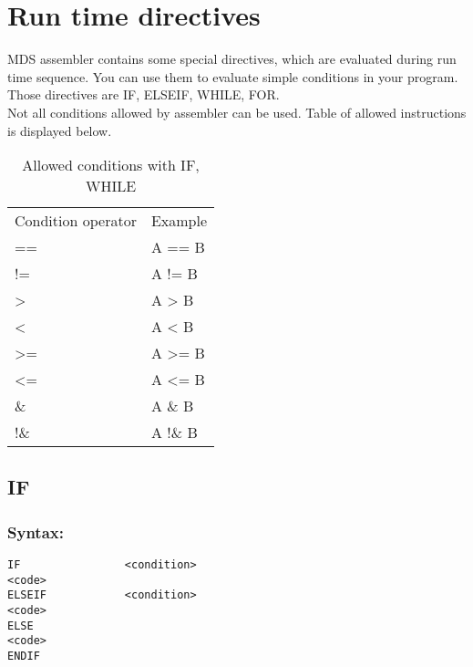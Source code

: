     \section{Run time directives}
        MDS assembler contains some special directives, which are evaluated during run time sequence. You can use them to evaluate simple conditions in your program. Those directives are IF, ELSEIF, WHILE, FOR.\\ Not all conditions allowed by assembler can be used. Table of allowed instructions is displayed below.
        \begin{table}[h!]
            \mysmallfont{}
            \centering{}
            \begin{tabular}{|l|l}
            \hline
            Condition operator       &          Example  \\
            ==                       &          A ==  B  \\
            !=                       &          A !=  B  \\
            >                        &          A >   B  \\
            <                        &          A <   B  \\
            >=                       &          A >=  B  \\
            <=                       &          A <=  B  \\
            \&                       &          A \&  B  \\
            !\&                      &          A !\& B
            \end{tabular}
            \caption{Allowed conditions with IF, WHILE}
        \end{table}

        \subsection{IF}
            \subsubsection{Syntax:}
            {
                \usecodefont
                \verb'IF                <condition>'\\
                \verb'<code>'\\
                \verb'ELSEIF            <condition>'\\
                \verb'<code>'\\
                \verb'ELSE'\\
                \verb'<code>'\\
                \verb'ENDIF'\\
            }

